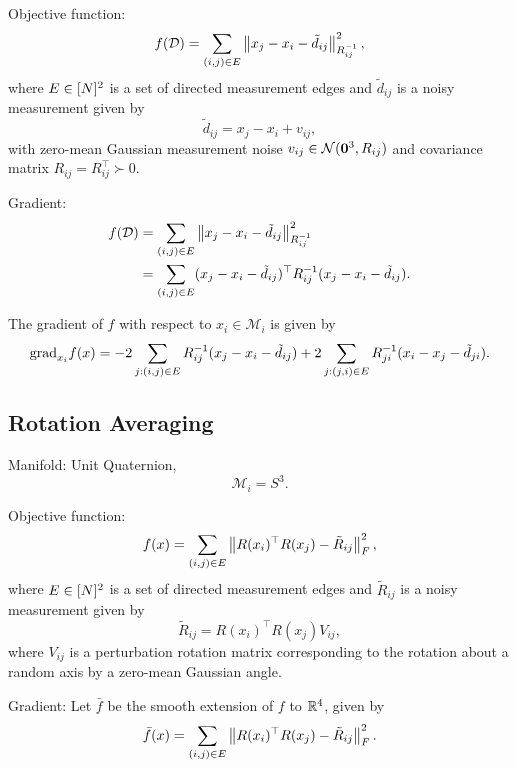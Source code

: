 Objective function:
\begin{equation}
    f(\mathcal{D}) = \sum_{(i,j)\in E} \left\lVert x_j - x_i - \tilde{d}_{ij} \right\rVert_{R_{ij}^{-1}}^2,
\end{equation}
where $E\in[N]^2$ is a set of directed measurement edges and $\tilde{d}_{ij}$ is a noisy measurement given by
\begin{equation}
    \tilde{d}_{ij} = x_j - x_i + v_{ij},
\end{equation}
with zero-mean Gaussian measurement noise $v_{ij} \in \mathcal{N}(\mathbf{0}^{3},R_{ij})$
and covariance matrix $R_{ij} = R_{ij}^\top \succ 0$.

Gradient:
\begin{align}
    f(\mathcal{D}) 
    &= \sum_{(i,j)\in E} \left\lVert x_j - x_i - \tilde{d}_{ij} \right\rVert_{R_{ij}^{-1}}^2
    \\
    &= \sum_{(i,j)\in E} (x_j - x_i - \tilde{d}_{ij})^\top R_{ij}^{-1} (x_j - x_i - \tilde{d}_{ij}).
\end{align}

The gradient of $f$ with respect to $x_i\in\mathcal{M}_i$ is given by
\begin{equation}
    \text{grad}_{x_i} f(x) = - 2 \sum_{j : (i,j)\in E} R_{ij}^{-1} (x_j - x_i - \tilde{d}_{ij}) 
    + 2 \sum_{j : (j,i) \in E} R_{ji}^{-1} (x_i - x_j - \tilde{d}_{ji}).
\end{equation}


\subsection{Rotation Averaging}
Manifold: Unit Quaternion,
\begin{equation}
    \mathcal{M}_i = S^3.
\end{equation}

Objective function:
\begin{equation}
    f(x) = \sum_{(i,j)\in E} \left\lVert R(x_i)^\top R(x_j) - \tilde{R}_{ij} \right\rVert_F^2,
\end{equation}
where $E\in[N]^2$ is a set of directed measurement edges and $\tilde{R}_{ij}$ is a noisy measurement given by
\begin{equation}
    \tilde{R}_{ij} = R(x_i)^\top R(x_j) V_{ij},
\end{equation}
where $V_{ij}$ is a perturbation rotation matrix corresponding to the rotation about a random axis by a zero-mean Gaussian angle.

Gradient:
Let $\bar{f}$ be the smooth extension of $f$ to $\mathbb{R}^{4}$, given by
\begin{equation}
    \bar{f}(x) = \sum_{(i,j)\in E} \left\lVert R(x_i)^\top R(x_j) - \tilde{R}_{ij} \right\rVert_F^2.
\end{equation}

